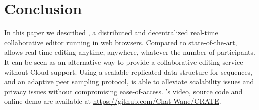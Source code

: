 
\section{Conclusion}
\label{sec:conclusion}

In this paper we described \CRATE, a distributed and decentralized real-time
collaborative editor running in web browsers. Compared to state-of-the-art,
\CRATE allows real-time editing anytime, anywhere, whatever the number of
participants. It can be seen as an alternative way to provide a collaborative
editing service without Cloud support. Using a scalable replicated data
structure for sequences, and an adaptive peer sampling protocol, \CRATE is able
to alleviate scalability issues and privacy issues without compromising
ease-of-access. \CRATE's video, source code and online demo are available at
\url{https://github.com/Chat-Wane/CRATE}.

